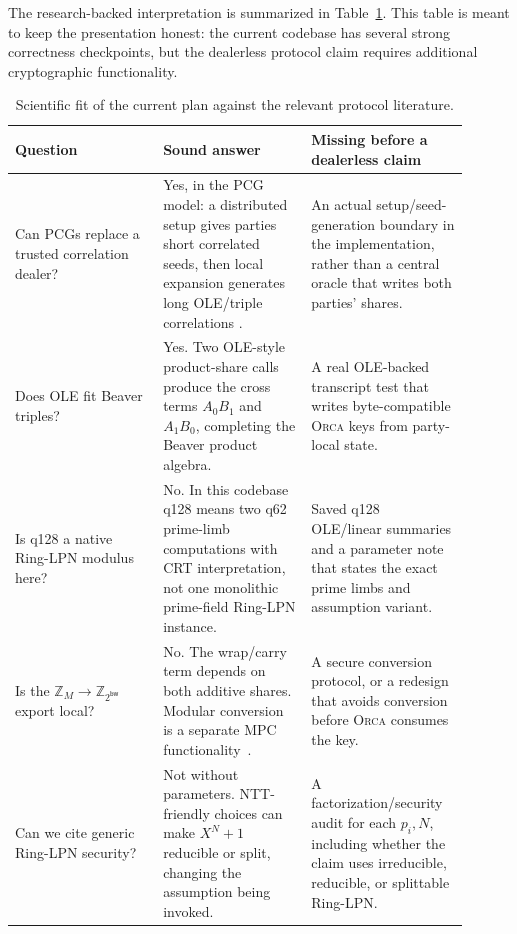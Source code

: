 \documentclass[11pt]{article}
\newcommand{\Z}{\mathbb{Z}}
\newcommand{\modtwo}{\Z_{2^{\mathsf{bw}}}}
\newcommand{\Orca}{\textsc{Orca}}
\begin{document}
The research-backed interpretation is summarized in Table~\ref{tab:audit}.
This table is meant to keep the presentation honest: the current codebase has
several strong correctness checkpoints, but the dealerless protocol claim
requires additional cryptographic functionality.

\begin{table}[h]
\centering
\small
\begin{tabular}{p{0.30\linewidth}p{0.30\linewidth}p{0.30\linewidth}}
\toprule
Question & Sound answer & Missing before a dealerless claim \\
\midrule
Can PCGs replace a trusted correlation dealer? &
Yes, in the PCG model: a distributed setup gives parties short correlated
seeds, then local expansion generates long OLE/triple correlations
\cite{boyle2022ringlpn,boyle2019pcg}. &
An actual setup/seed-generation boundary in the implementation, rather than a
central oracle that writes both parties' shares. \\
Does OLE fit Beaver triples? &
Yes. Two OLE-style product-share calls produce the cross terms
\(A_0B_1\) and \(A_1B_0\), completing the Beaver product algebra. &
A real OLE-backed transcript test that writes byte-compatible \Orca{} keys
from party-local state. \\
Is q128 a native Ring-LPN modulus here? &
No. In this codebase q128 means two q62 prime-limb computations with CRT
interpretation, not one monolithic prime-field Ring-LPN instance. &
Saved q128 OLE/linear summaries and a parameter note that states the exact
prime limbs and assumption variant. \\
Is the \(\Z_M \rightarrow \modtwo\) export local? &
No. The wrap/carry term depends on both additive shares. Modular conversion is
a separate MPC functionality~\cite{yu2011modcnv,escudero2020edabits}. &
A secure conversion protocol, or a redesign that avoids conversion before
\Orca{} consumes the key. \\
Can we cite generic Ring-LPN security? &
Not without parameters. NTT-friendly choices can make \(X^N+1\) reducible or
split, changing the assumption being invoked. &
A factorization/security audit for each \(p_i,N\), including whether the claim
uses irreducible, reducible, or splittable Ring-LPN. \\
\bottomrule
\end{tabular}
\caption{Scientific fit of the current plan against the relevant protocol
literature.}
\label{tab:audit}
\end{table}
\end{document}
